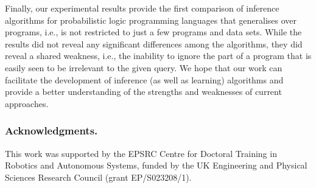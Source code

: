 \documentclass[runningheads]{llncs}
\newcommand{\variable}[1]{\texttt{\textup{#1}}}
\begin{document}
Finally, our experimental results provide the first comparison of inference
algorithms for probabilistic logic programming languages that generalises over
programs, i.e., is not restricted to just a few programs and data sets. While
the results did not reveal any significant differences among the algorithms,
they did reveal a shared weakness, i.e., the inability to ignore the part of a
program that is easily seen to be irrelevant to the given query. We hope that
our work can facilitate the development of inference (as well as learning)
algorithms and provide a better understanding of the strengths and weaknesses of
current approaches.

\subsubsection*{Acknowledgments.}
This work was supported by the EPSRC Centre for Doctoral Training in Robotics
and Autonomous Systems, funded by the UK Engineering and Physical Sciences
Research Council (grant EP/S023208/1).




\appendix



\end{document}
